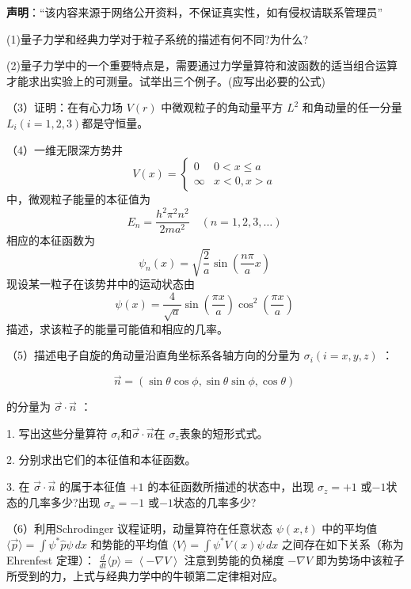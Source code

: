 
\textbf{声明}：“该内容来源于网络公开资料，不保证真实性，如有侵权请联系管理员”

(1)量子力学和经典力学对于粒子系统的描述有何不同?为什么?

(2)量子力学中的一个重要特点是，需要通过力学量算符和波函数的适当组合运算才能求出实验上的可测量。试举出三个例子。(应写出必要的公式)

（3）证明：在有心力场 $V(r)$ 中微观粒子的角动量平方 $ L^2 $ 和角动量的任一分量 $L_i (i=1,2,3)$都是守恒量。

（4）一维无限深方势井
$$V(x) = 
\begin{cases} 
0 & 0 < x \leq a \\
\infty & x < 0, x > a 
\end{cases}~$$
中，微观粒子能量的本征值为
$$E_n = \frac{h^2 \pi^2 n^2}{2ma^2} \quad (n = 1, 2, 3, \ldots)~$$
相应的本征函数为
$$\psi_n(x) = \sqrt{\frac{2}{a}} \sin \left( \frac{n \pi }{a} x \right)~$$
现设某一粒子在该势井中的运动状态由
$$\psi(x) = \frac{4}{\sqrt{a}} \sin \left( \frac{\pi x}{a} \right) \cos^2 \left( \frac{\pi x}{a} \right)~$$
描述，求该粒子的能量可能值和相应的几率。

（5）描述电子自旋的角动量沿直角坐标系各轴方向的分量为 $\sigma_i (i=x,y,z)$ ：

$$\vec{n} = (\sin \theta \cos \phi, \sin \theta \sin \phi, \cos \theta)~$$

的分量为 $\vec{\sigma} \cdot \vec{n}$ ：

1. 写出这些分量算符 $\sigma_i$和$\vec{\sigma} \cdot \vec{n}$在 $\sigma_z$表象的短形式式。

2. 分别求出它们的本征值和本征函数。

3. 在 $\vec{\sigma} \cdot \vec{n}$ 的属于本征值 $+1$ 的本征函数所描述的状态中，出现 $\sigma_z = +1$ 或$-1$状态的几率多少?出现 $\sigma_x = -1$ 或$-1$状态的几率多少?

（6）利用Schrodinger 议程证明，动量算符在任意状态 $\psi(x,t)$ 中的平均值
$\langle \vec{p} \rangle = \int \psi^* \hat{p} \psi \, dx $
和势能的平均值
$\langle V \rangle = \int \psi^* V(x) \psi \, dx $
之间存在如下关系（称为Ehrenfest 定理）：
$ \frac{d}{dt} \langle p \rangle = \left\langle - \nabla V \right\rangle $
注意到势能的负梯度 $ - \nabla V $ 即为势场中该粒子所受到的力，上式与经典力学中的牛顿第二定律相对应。